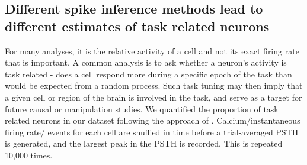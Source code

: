 \documentclass[a4paper,10pt,twocolumn]{article}
\begin{document}



\subsection{Different spike inference methods lead to different estimates of task related neurons}


For many analyses, it is the relative activity of a cell and not its exact firing rate that is important. A common analysis is to ask whether a neuron's activity is task related - does a cell respond more during a specific epoch of the task than would be expected from a random process. Such task tuning may then imply that a given cell or region of the brain is involved in the task, and serve as a target for future causal or manipulation studies. We quantified the proportion of task related neurons in our dataset following the approach of \citealt{Peron2015-qz}. Calcium/instantaneous firing rate/ events for each cell are shuffled in time before a trial-averaged PSTH is generated, and the largest peak in the PSTH is recorded. This is repeated 10,000 times. 
\end{document}
